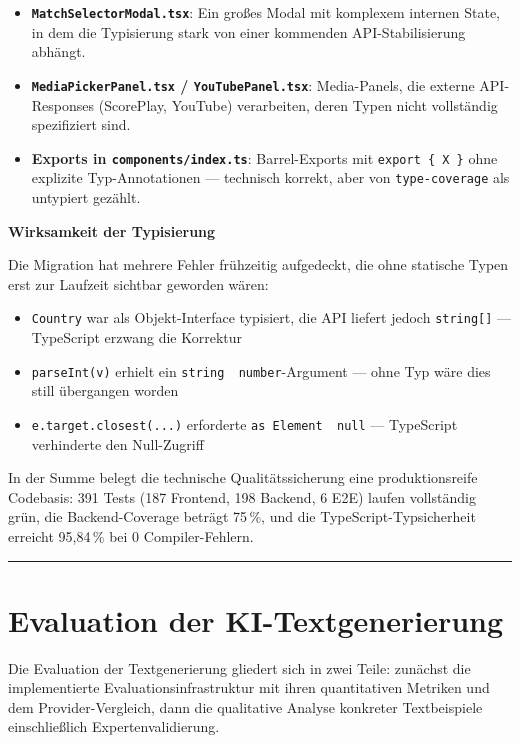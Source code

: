 \begin{itemize}
\tightlist
\item
  \textbf{\texttt{MatchSelectorModal.tsx}}: Ein großes Modal mit
  komplexem internen State, in dem die Typisierung stark von einer
  kommenden API-Stabilisierung abhängt.
\item
  \textbf{\texttt{MediaPickerPanel.tsx} / \texttt{YouTubePanel.tsx}}:
  Media-Panels, die externe API-Responses (ScorePlay, YouTube)
  verarbeiten, deren Typen nicht vollständig spezifiziert sind.
\item
  \textbf{Exports in \texttt{components/index.ts}}: Barrel-Exports mit
  \texttt{export\ \{\ X\ \}} ohne explizite Typ-Annotationen ---
  technisch korrekt, aber von \texttt{type-coverage} als untypiert
  gezählt.
\end{itemize}

\textbf{Wirksamkeit der Typisierung}

Die Migration hat mehrere Fehler frühzeitig aufgedeckt, die ohne statische Typen erst zur Laufzeit sichtbar geworden wären:

\begin{itemize}
\tightlist
\item
  \texttt{Country} war als Objekt-Interface typisiert, die API liefert
  jedoch \texttt{string{[}{]}} --- TypeScript erzwang die Korrektur
\item
  \texttt{parseInt(v)} erhielt ein
  \texttt{string\ \textbar{}\ number}-Argument --- ohne Typ wäre dies
  still übergangen worden
\item
  \texttt{e.target.closest(...)} erforderte
  \texttt{as\ Element\ \textbar{}\ null} --- TypeScript verhinderte den
  Null-Zugriff
\end{itemize}

In der Summe belegt die technische Qualitätssicherung eine produktionsreife Codebasis: 391 Tests (187 Frontend, 198 Backend, 6 E2E) laufen vollständig grün, die Backend-Coverage beträgt 75\,\%, und die TypeScript-Typsicherheit erreicht 95,84\,\% bei 0 Compiler-Fehlern.

\begin{center}\rule{0.5\linewidth}{0.5pt}\end{center}

\section{Evaluation der
KI-Textgenerierung}\label{evaluation-der-ki-textgenerierung}

Die Evaluation der Textgenerierung gliedert sich in zwei Teile: zunächst
die implementierte Evaluationsinfrastruktur mit ihren quantitativen
Metriken und dem Provider-Vergleich, dann die qualitative Analyse
konkreter Textbeispiele einschließlich Expertenvalidierung.

